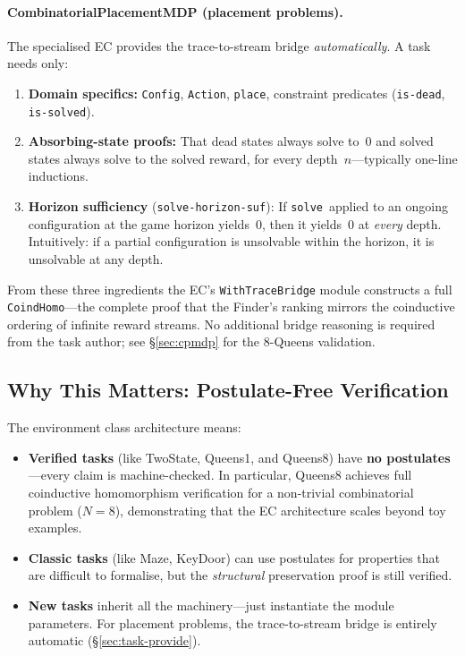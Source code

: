 \documentclass[9pt,a4paper]{article}
\theoremstyle{plain}
\theoremstyle{definition}
\theoremstyle{remark}
\begin{document}
\paragraph{CombinatorialPlacementMDP (placement problems).}
The specialised EC provides the trace-to-stream bridge \emph{automatically}. A task needs only:
\begin{enumerate}
\item \textbf{Domain specifics:} \texttt{Config}, \texttt{Action}, \texttt{place}, constraint predicates (\texttt{is-dead}, \texttt{is-solved}).
\item \textbf{Absorbing-state proofs:} That dead states always solve to~$0$ and solved states always solve to the solved reward, for every depth~$n$---typically one-line inductions.
\item \textbf{Horizon sufficiency} (\texttt{solve-horizon-suf}): If \texttt{solve}~applied to an ongoing configuration at the game horizon yields~$0$, then it yields~$0$ at \emph{every} depth. Intuitively: if a partial configuration is unsolvable within the horizon, it is unsolvable at any depth.
\end{enumerate}

\noindent From these three ingredients the EC's \texttt{WithTraceBridge} module constructs a full \texttt{CoindHomo}---\allowbreak the complete proof that the Finder's ranking mirrors the coinductive ordering of infinite reward streams.  No additional bridge reasoning is required from the task author; see \S\ref{sec:cpmdp} for the 8-Queens validation.

\subsection{Why This Matters: Postulate-Free Verification}

The environment class architecture means:

\begin{itemize}
\item \textbf{Verified tasks} (like TwoState, Queens1, and Queens8) have \textbf{no postulates}---every claim is machine-checked. In particular, Queens8 achieves full coinductive homomorphism verification for a non-trivial combinatorial problem ($N = 8$), demonstrating that the EC architecture scales beyond toy examples.
\item \textbf{Classic tasks} (like Maze, KeyDoor) can use postulates for properties that are difficult to formalise, but the \emph{structural} preservation proof is still verified.
\item \textbf{New tasks} inherit all the machinery---just instantiate the module parameters. For placement problems, the trace-to-stream bridge is entirely automatic (\S\ref{sec:task-provide}).
\end{itemize}
\end{document}
